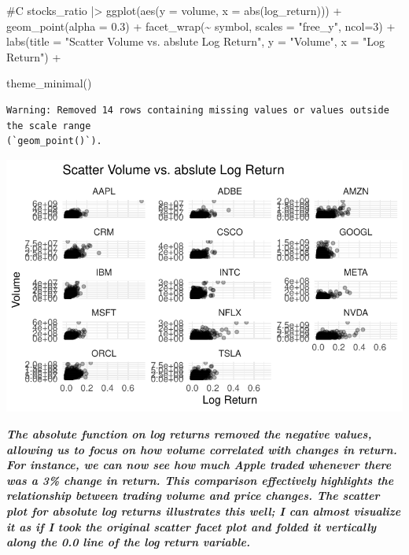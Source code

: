 \documentclass[
  letterpaper,
  DIV=11,
  numbers=noendperiod]{scrartcl}
\newenvironment{Shaded}{\begin{snugshade}}{\end{snugshade}}
\newcommand{\AttributeTok}[1]{\textcolor[rgb]{0.40,0.45,0.13}{#1}}
\newcommand{\CommentTok}[1]{\textcolor[rgb]{0.37,0.37,0.37}{#1}}
\newcommand{\DecValTok}[1]{\textcolor[rgb]{0.68,0.00,0.00}{#1}}
\newcommand{\FloatTok}[1]{\textcolor[rgb]{0.68,0.00,0.00}{#1}}
\newcommand{\FunctionTok}[1]{\textcolor[rgb]{0.28,0.35,0.67}{#1}}
\newcommand{\NormalTok}[1]{\textcolor[rgb]{0.00,0.23,0.31}{#1}}
\newcommand{\SpecialCharTok}[1]{\textcolor[rgb]{0.37,0.37,0.37}{#1}}
\newcommand{\StringTok}[1]{\textcolor[rgb]{0.13,0.47,0.30}{#1}}
\begin{document}
\begin{itemize}
\begin{Shaded}
\begin{Highlighting}[]
\CommentTok{\#C}
\NormalTok{stocks\_ratio }\SpecialCharTok{|\textgreater{}}
  \FunctionTok{ggplot}\NormalTok{(}\FunctionTok{aes}\NormalTok{(}\AttributeTok{y =}\NormalTok{ volume, }\AttributeTok{x =} \FunctionTok{abs}\NormalTok{(log\_return))) }\SpecialCharTok{+}
  \FunctionTok{geom\_point}\NormalTok{(}\AttributeTok{alpha =} \FloatTok{0.3}\NormalTok{) }\SpecialCharTok{+}
  \FunctionTok{facet\_wrap}\NormalTok{(}\SpecialCharTok{\textasciitilde{}}\NormalTok{ symbol, }\AttributeTok{scales =} \StringTok{"free\_y"}\NormalTok{, }\AttributeTok{ncol=}\DecValTok{3}\NormalTok{) }\SpecialCharTok{+}
  \FunctionTok{labs}\NormalTok{(}\AttributeTok{title =} \StringTok{"Scatter Volume vs. abslute Log Return"}\NormalTok{,}
       \AttributeTok{y =} \StringTok{"Volume"}\NormalTok{,}
       \AttributeTok{x =} \StringTok{"Log Return"}\NormalTok{) }\SpecialCharTok{+}

  \FunctionTok{theme\_minimal}\NormalTok{()}
\end{Highlighting}
\end{Shaded}

\begin{verbatim}
Warning: Removed 14 rows containing missing values or values outside the scale range
(`geom_point()`).
\end{verbatim}

  \includegraphics{Lab4_files/figure-pdf/problem3-2.pdf}

  \textbf{\emph{The absolute function on log returns removed the
  negative values, allowing us to focus on how volume correlated with
  changes in return. For instance, we can now see how much Apple traded
  whenever there was a 3\% change in return. This comparison effectively
  highlights the relationship between trading volume and price changes.
  The scatter plot for absolute log returns illustrates this well; I can
  almost visualize it as if I took the original scatter facet plot and
  folded it vertically along the 0.0 line of the log return variable.}}
\end{itemize}
\end{document}
